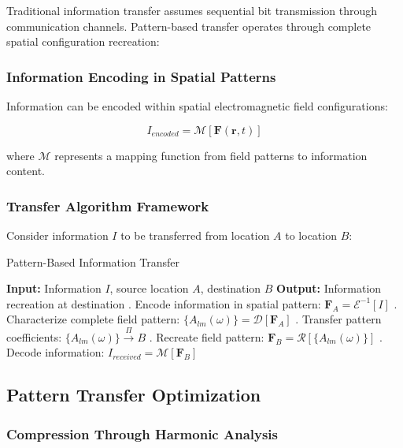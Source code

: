 \documentclass[12pt,a4paper]{article}
\begin{document}
Traditional information transfer assumes sequential bit transmission through communication channels. Pattern-based transfer operates through complete spatial configuration recreation:

\subsubsection{Information Encoding in Spatial Patterns}

Information can be encoded within spatial electromagnetic field configurations:

\begin{equation}
I_{encoded} = \mathcal{M}[\mathbf{F}(\mathbf{r}, t)]
\label{eq:spatial_information_encoding}
\end{equation}

where $\mathcal{M}$ represents a mapping function from field patterns to information content.

\subsubsection{Transfer Algorithm Framework}

Consider information $I$ to be transferred from location $A$ to location $B$:

\begin{algorithm}[H]
\caption{Pattern-Based Information Transfer}
\begin{algorithmic}
\State \textbf{Input:} Information $I$, source location $A$, destination $B$
\State \textbf{Output:} Information recreation at destination
\State 
{}. Encode information in spatial pattern: $\mathbf{F}_A = \mathcal{E}^{-1}[I]$
. Characterize complete field pattern: $\{A_{lm}(\omega)\} = \mathcal{D}[\mathbf{F}_A]$  
. Transfer pattern coefficients: $\{A_{lm}(\omega)\} \xrightarrow{\Pi} B$
. Recreate field pattern: $\mathbf{F}_B = \mathcal{R}[\{A_{lm}(\omega)\}]$
. Decode information: $I_{received} = \mathcal{M}[\mathbf{F}_B]$
\end{algorithmic}
\end{algorithm}

\subsection{Pattern Transfer Optimization}

\subsubsection{Compression Through Harmonic Analysis}
\end{document}
